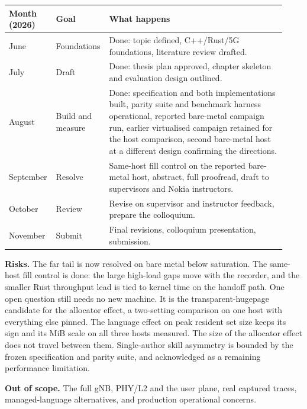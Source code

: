 \documentclass[11pt,a4paper]{article}
\begin{document}
\begin{center}
\begin{tabular}{@{}R{0.16\linewidth} R{0.14\linewidth} R{0.63\linewidth}@{}}
\hline\hline
Month (2026) & Goal & What happens \\
\hline
June & Foundations & Done: topic defined, C++/Rust/5G foundations, literature review drafted. \\
July & Draft & Done: thesis plan approved, chapter skeleton and evaluation design outlined. \\
August & Build and measure & Done: specification and both implementations built, parity suite
and benchmark harness operational, reported bare-metal campaign run, earlier
virtualised campaign retained for the host comparison, second bare-metal host at a different
design confirming the directions. \\
September & Resolve & Same-host fill control on the reported bare-metal host,
abstract, full proofread, draft to supervisors and Nokia instructors. \\
October & Review & Revise on supervisor and instructor feedback, prepare the colloquium. \\
November & Submit & Final revisions, colloquium presentation, submission. \\
\hline
\end{tabular}
\end{center}

\textbf{Risks.} The far tail is now resolved on bare metal below saturation. The
same-host fill control is done: the large high-load gaps move with the recorder,
and the smaller Rust throughput lead is tied to kernel time on the handoff path.
One open question still
needs no new machine. It is the transparent-hugepage candidate for the allocator effect, a
two-setting comparison on one host with everything else pinned. The language effect on
peak resident set size keeps its sign and its MiB scale on all three hosts measured. The
size of the allocator effect does not travel between them.
Single-author skill asymmetry is bounded by the frozen specification and parity
suite, and acknowledged as a remaining performance limitation.

\textbf{Out of scope.} The full gNB, PHY/L2 and the user plane, real captured
traces, managed-language alternatives, and production operational concerns.

\printbibliography
\end{document}
